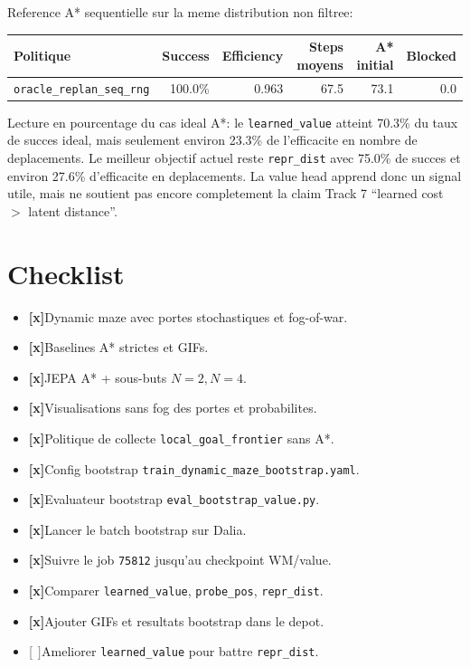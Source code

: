 \documentclass[11pt,a4paper]{article}
\newcommand{\done}{\textbf{\textcolor{green!50!black}{[x]}}}
\newcommand{\todo}{\textbf{\textcolor{gray}{[ ]}}}
\newcommand{\code}[1]{\texttt{#1}}
\begin{document}
Reference A* sequentielle sur la meme distribution non filtree:

\begin{center}
\begin{tabular}{lrrrrr}
\toprule
Politique & Success & Efficiency & Steps moyens & A* initial & Blocked \\
\midrule
\code{oracle\_replan\_seq\_rng} & 100.0\% & 0.963 & 67.5 & 73.1 & 0.0 \\
\bottomrule
\end{tabular}
\end{center}

Lecture en pourcentage du cas ideal A*: le \code{learned\_value} atteint
70.3\% du taux de succes ideal, mais seulement environ 23.3\% de l'efficacite
en nombre de deplacements. Le meilleur objectif actuel reste \code{repr\_dist}
avec 75.0\% de succes et environ 27.6\% d'efficacite en deplacements. La value
head apprend donc un signal utile, mais ne soutient pas encore completement la
claim Track 7 ``learned cost \(>\) latent distance''.

\section{Checklist}

\begin{itemize}
  \item \done Dynamic maze avec portes stochastiques et fog-of-war.
  \item \done Baselines A* strictes et GIFs.
  \item \done JEPA A* + sous-buts \(N=2,N=4\).
  \item \done Visualisations sans fog des portes et probabilites.
  \item \done Politique de collecte \code{local\_goal\_frontier} sans A*.
  \item \done Config bootstrap \code{train\_dynamic\_maze\_bootstrap.yaml}.
  \item \done Evaluateur bootstrap \code{eval\_bootstrap\_value.py}.
  \item \done Lancer le batch bootstrap sur Dalia.
  \item \done Suivre le job \code{75812} jusqu'au checkpoint WM/value.
  \item \done Comparer \code{learned\_value}, \code{probe\_pos}, \code{repr\_dist}.
  \item \done Ajouter GIFs et resultats bootstrap dans le depot.
  \item \todo Ameliorer \code{learned\_value} pour battre \code{repr\_dist}.
\end{itemize}
\end{document}
